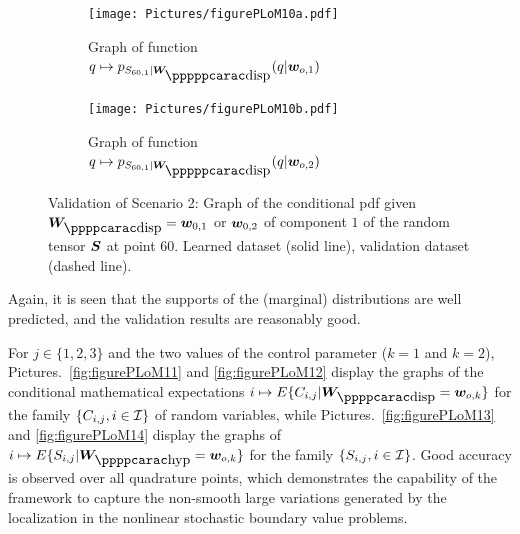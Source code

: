 \begin{figure}[!htb]
    \begin{center}
        \begin{subfigure}[b]{0.45\textwidth}
            \begin{center}
                \texttt{[image: Pictures/figurePLoM10a.pdf]}
            \end{center}
                \caption{Graph of function $q\mapsto p_{ S_{60,1} \vert \bfW_\disppp } (q \vert \bfw_{o,1})$}
                \label{fig:figurePLoM10a}
            \end{subfigure}
            \begin{subfigure}[b]{0.45\textwidth}
                \begin{center}
                    \texttt{[image: Pictures/figurePLoM10b.pdf]}
                \end{center}
                \caption{Graph of function $q\mapsto p_{ S_{60,1} \vert \bfW_\disppp } (q \vert \bfw_{o,2})$}
                \label{fig:figurePLoM10b}
            \end{subfigure}
    \end{center}
    \caption[Validation of Scenario 2: Graph of the conditional pdf.]{Validation of Scenario 2: Graph of the conditional pdf given $\bfW_\dispp =\bfw_{0,1}$ or ${\boldsymbol{w}}_{0,2}$ of component $1$ of the random tensor ${\boldsymbol{S}}$ at point $60$. Learned dataset (solid line), validation dataset (dashed line).}
    \label{fig:figurePLoM10}
\end{figure}
Again, it is seen that the supports of the (marginal) distributions are well predicted, and the validation results are reasonably good.

For $j\in\{1,2,3\}$ and the two values of the control parameter ($k=1$ and $k=2$), Pictures.~\ref{fig:figurePLoM11} and
\ref{fig:figurePLoM12} display the graphs of the conditional mathematical expectations
$i\mapsto E\{ C_{i,j} \vert \bfW_\dispp = \bfw_{o,k} \}$  for the family  $\{C_{i,j},i\in{\mathcal{I}}\}$ of random variables, while Pictures.~\ref{fig:figurePLoM13} and \ref{fig:figurePLoM14} display the graphs of $i\mapsto E\{ S_{i,j} \vert \bfW_\hypp = \bfw_{o,k} \}$  for the family  $\{S_{i,j},i\in{\mathcal{I}}\}$. Good accuracy is observed over all quadrature points, which demonstrates the capability of the framework to capture the non-smooth large variations generated by the localization in the nonlinear stochastic boundary value problems.

